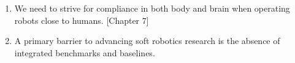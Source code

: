 \documentclass{propositions}
\begin{document}
\begin{enumerate}
    \item %
    We need to strive for compliance in both body and brain when operating robots close to humans.
    [Chapter 7]
    \item %
    A primary barrier to advancing soft robotics research is the absence of integrated benchmarks and baselines.

\end{enumerate}
\end{document}
